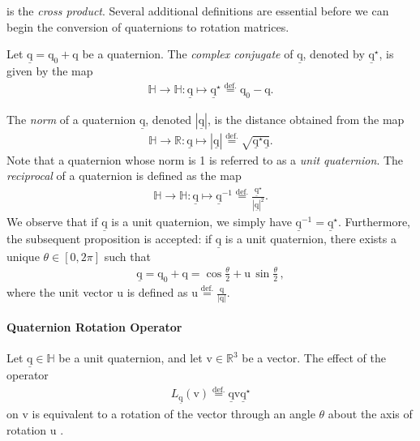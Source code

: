 \noindent is the \textit{cross product}.
\bigbreak 
Several additional definitions are essential before we can begin the conversion of quaternions to rotation matrices. 


\noindent Let $\underline{\bm{\mathrm{q}}}=\mathrm{q}_0 + \bm{\mathrm{q}}$ be a quaternion. The \textit{complex conjugate} of $\underline{\bm{\mathrm{q}}}$, denoted by $\underline{\bm{\mathrm{q}}}^\star$, is given by the map
\begin{align*}
	\mathbb{H}\rightarrow\mathbb{H}:\underline{\bm{\mathrm{q}}}\mapsto\underline{\bm{\mathrm{q}}}^\star\stackrel{\text{def.}}{=}\mathrm{q}_0 - \bm{\mathrm{q}}.
\end{align*} 

\noindent The \textit{norm} of a quaternion $\underline{\bm{\mathrm{q}}}$, denoted $|\underline{\bm{\mathrm{q}}}|$, is the distance obtained from the map 
\begin{align*}
	\mathbb{H}\rightarrow\mathbb{R}:\underline{\bm{\mathrm{q}}}\mapsto|\underline{\bm{\mathrm{q}}}|\stackrel{\text{def.}}{=}\sqrt{\underline{\bm{\mathrm{q}}}^\star\underline{\bm{\mathrm{q}}}}.
\end{align*} 
Note that a quaternion whose norm is 1 is referred to as a \textit{unit quaternion}. The \textit{reciprocal} of a quaternion is defined as the map
\begin{align*}
	\mathbb{H}\rightarrow\mathbb{H}:\underline{\bm{\mathrm{q}}}\mapsto\underline{\bm{\mathrm{q}}}^{-1}\stackrel{\text{def.}}{=}\frac{\underline{\bm{\mathrm{q}}}^\star}{|\underline{\bm{\mathrm{q}}}|^2}.
\end{align*} 
We observe that if $\underline{\bm{\mathrm{q}}}$ is a unit quaternion, we simply have $\underline{\bm{\mathrm{q}}}^{-1}=\underline{\bm{\mathrm{q}}}^\star$. Furthermore, the subsequent proposition is accepted: if $\underline{\bm{\mathrm{q}}}$ is a unit quaternion, there exists a unique $\theta\in[0,2\pi]$ such that
\begin{align*}
	\underline{\bm{\mathrm{q}}} = \mathrm{q}_0 + \bm{\mathrm{q}}=\cos\frac{\theta}{2}+\bm{\mathrm{u}}\,\sin\frac{\theta}{2}\,,
\end{align*}
where the unit vector $\bm{\mathrm{u}}$ is defined as $\bm{\mathrm{u}}\stackrel{\text{def.}}{=}\frac{\bm{\mathrm{q}}}{|\bm{\mathrm{q}}|}$.

\setlength{\belowdisplayskip}{0.15cm}

\paragraph{Quaternion Rotation Operator} Let $\underline{\bm{\mathrm{q}}}\in\mathbb{H}$ be a unit quaternion, and let $\bm{\mathrm{v}}\in\mathbb{R}^3$ be a vector. The effect of the operator 
\begin{align*}
	L_{\underline{\bm{\mathrm{q}}}}(\bm{\mathrm{v}}) \stackrel{\text{def.}}{=} \underline{\bm{\mathrm{q}}}\bm{\mathrm{v}}\underline{\bm{\mathrm{q}}}^\star
\end{align*}
on $\bm{\mathrm{v}}$ is equivalent to a rotation of the vector through an angle $\theta$ about the axis of rotation $\bm{\mathrm{u}}$
.
\setlength{\belowdisplayskip}{0.3cm}

